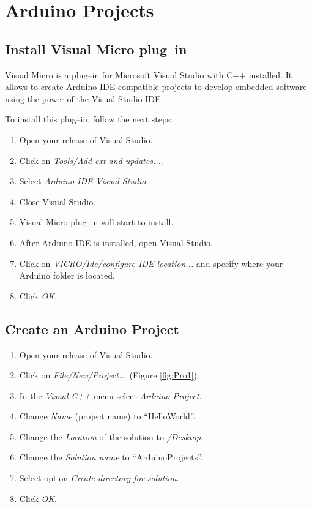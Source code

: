 \chapter{Arduino Projects}

    \section{Install Visual Micro plug--in}
    
Visual Micro is a plug--in for Microsoft Visual Studio with C++ installed. It allows to create Arduino IDE compatible projects to 
develop embedded software using the power of the Visual Studio IDE. 

To install this plug--in, follow the next steps: 

\begin{enumerate} 
	
	\item Open your release of Visual Studio.
	\item Click on \textit{Tools/Add ext and updates...}.
	\item Select  \textit{Arduino IDE Visual Studio}.
	\item Close Visual Studio. 
	\item Visual Micro plug--in will start to install. 
	\item After Arduino IDE is installed, open Visual Studio.  
	\item Click on  \textit{VICRO/Ide/configure IDE location...} and  specify where your Arduino folder is located. 
	\item Click \textit{OK}.
		
\end{enumerate}



    \section{Create an Arduino Project}

\begin{enumerate} 
	
	\item Open your release of Visual Studio.
	\item Click on \textit{File/New/Project...} (Figure \ref{fig:Pro1}).
	\item In the \textit{Visual C++} menu select \textit{Arduino Project}.
	\item Change \textit{Name} (project name) to ``HelloWorld''. 
	\item Change the \textit{Location} of the solution to \textit{/Desktop}.
	\item Change the \textit{Solution name} to ``ArduinoProjects''.  
	\item Select option \textit{Create directory for solution}.
	\item Click \textit{OK}.		
\end{enumerate}

